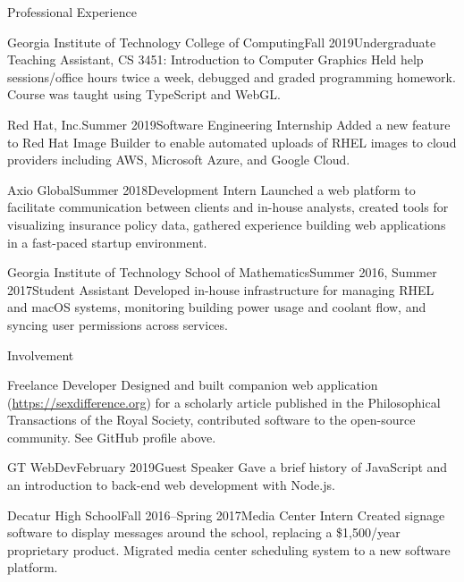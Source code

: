 \documentclass[hidelinks]{resume}
\begin{document}
\begin{rSection}{Professional Experience}
	\begin{rSubsection}{Georgia Institute of Technology College of Computing}{Fall 2019}{Undergraduate Teaching Assistant, CS 3451: Introduction to Computer Graphics}{}
		Held help sessions/office hours twice a week, debugged and graded programming homework. Course was taught using TypeScript and WebGL.
	\end{rSubsection}
	\begin{rSubsection}{Red Hat, Inc.}{Summer 2019}{Software Engineering Internship}{}
		Added a new feature to Red Hat Image Builder to enable automated uploads of RHEL images to cloud providers including AWS, Microsoft Azure, and Google Cloud.
	\end{rSubsection}
	\begin{rSubsection}{Axio Global}{Summer 2018}{Development Intern}{}
		Launched a web platform to facilitate communication between clients and in-house analysts, created tools for visualizing insurance policy data, gathered experience building web applications in a fast-paced startup environment.
	\end{rSubsection}
	\begin{rSubsection}{Georgia Institute of Technology School of Mathematics}{Summer 2016, Summer 2017}{Student Assistant}{}
		Developed in-house infrastructure for managing RHEL and macOS systems, monitoring building power usage and coolant flow, and syncing user permissions across services.
	\end{rSubsection}
\end{rSection}

\begin{rSection}{Involvement}
	\begin{rSubsection}{Freelance Developer}{}{}{}
		Designed and built companion web application (\url{https://sexdifference.org}) for a scholarly article published in the Philosophical Transactions of the Royal Society, contributed software to the open-source community. See GitHub profile above.
	\end{rSubsection}
	\begin{rSubsection}{GT WebDev}{February 2019}{Guest Speaker}{}
		Gave a brief history of JavaScript and an introduction to back-end web development with Node.js.
	\end{rSubsection}
	\begin{rSubsection}{Decatur High School}{Fall 2016--Spring 2017}{Media Center Intern}{}
		Created signage software to display messages around the school, replacing a \$1,500/year proprietary product. Migrated media center scheduling system to a new software platform.
	\end{rSubsection}
\end{rSection}
\end{document}
